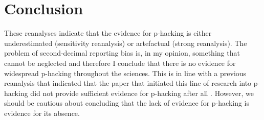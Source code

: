 \section{Conclusion}
These reanalyses indicate that the evidence for p-hacking is either underestimated (sensitivity reanalysis) or artefactual  (strong reanalysis). The problem of second-decimal reporting bias is, in my opinion, something that cannot be neglected and therefore I conclude that there is no evidence for widespread p-hacking throughout the sciences. This is in line with a previous reanalysis that indicated that the paper that initiated this line of research into p-hacking \cite{Masicampo2012} did not provide sufficient evidence for p-hacking after all \cite{Lakens2014}. However, we should be cautious about concluding that the lack of evidence for p-hacking is evidence for its absence.